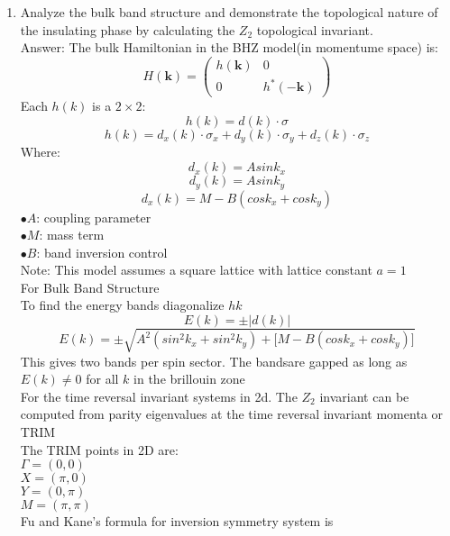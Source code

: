 \documentclass[a4paper,12pt]{article}
\begin{document}
\begin{enumerate}
    \item Analyze the bulk band structure and demonstrate the topological nature of the insulating phase by calculating the $Z_2$ topological invariant.\\
Answer: The bulk Hamiltonian in the BHZ model(in momentume space) is:\\
\[ H(\mathbf{k}) = \begin{pmatrix}
h(\mathbf{k}) & 0\\
0 & h^\ast(\mathbf{-k})
\end{pmatrix}\]
Each $h(k)$ is a $2\times2$:\\
\[h(k)=d(k)\cdot\sigma\]
\[h(k)=d_{x}(k)\cdot\sigma_{x} + d_{y}(k)\cdot\sigma_{y}+ d_{z}(k)\cdot\sigma_{z}\]
Where:\\
\[d_{x}(k) = Asink_{x}\]
\[d_{y}(k) = Asink_{y}\]
\[d_{x}(k) = M-B(cos k_{x} + cosk_{y}) \]
$\bullet A$: coupling parameter\\
$\bullet M$: mass term\\
$\bullet B$: band inversion control\\
Note: This model assumes a square lattice with lattice constant $a= 1$\\
For Bulk Band Structure\\
To find the energy bands diagonalize $h{k}$\\
\[E(k) = \pm|d(k)|\]
\[E(k) = \pm\sqrt{A^{2}(sin^{2}k_{x} + sin^{2}k_{y}) + \lbrack M - B(cos k_{x} + cos k_{y})\rbrack}\]
This gives two bands per spin sector. The bandsare gapped as long as $E(k) \neq 0$ for all $k$ in the brillouin zone\\ 

For the time reversal invariant systems in 2d. The $Z_{2}$ invariant can be computed from parity eigenvalues at the time reversal invariant momenta or TRIM\\
The TRIM points in 2D are:\\
$\Gamma = (0,0)$\\
$X = (\pi,0)$\\
$Y = (0,\pi)$\\
$M = (\pi,\pi)$\\

Fu and Kane's formula for inversion symmetry system is


\end{enumerate}
\end{document}

